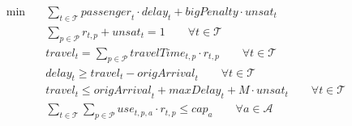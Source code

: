 \begin{align}
  \min\quad & \sum_{t \in \mathcal{T}} \mathit{passenger}_{t} \cdot \mathit{delay}_{t} + \mathit{bigPenalty} \cdot \mathit{unsat}_{t} \tag{obj} \\
  & \sum_{p \in \mathcal{P}} r_{t,p} + \mathit{unsat}_{t} = 1 \qquad \forall t \in \mathcal{T} \tag{select\_or\_cancel} \\
  & \mathit{travel}_{t} = \sum_{p \in \mathcal{P}} \mathit{travelTime}_{t,p} \cdot r_{t,p} \qquad \forall t \in \mathcal{T} \tag{travel\_def} \\
  & \mathit{delay}_{t} \ge \mathit{travel}_{t} - \mathit{origArrival}_{t} \qquad \forall t \in \mathcal{T} \tag{delay\_def} \\
  & \mathit{travel}_{t} \le \mathit{origArrival}_{t} + \mathit{maxDelay}_{t} + \mathit{M} \cdot \mathit{unsat}_{t} \qquad \forall t \in \mathcal{T} \tag{max\_delay} \\
  & \sum_{t \in \mathcal{T}} \sum_{p \in \mathcal{P}} \mathit{use}_{t,p,a} \cdot r_{t,p} \le \mathit{cap}_{a} \qquad \forall a \in \mathcal{A} \tag{capacity} \\
\end{align}